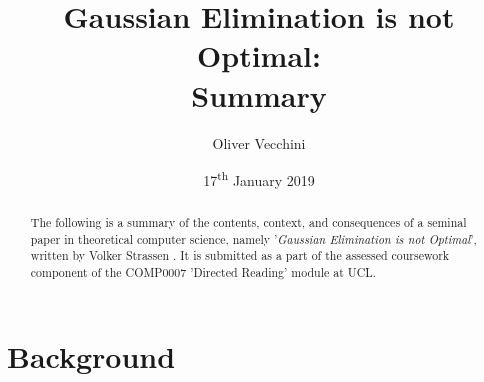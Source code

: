 \documentclass[11pt]{article}
\begin{document}
\title{Gaussian Elimination is not Optimal: \\Summary}
\author{Oliver Vecchini}
\date{17\textsuperscript{th} January 2019}

\maketitle


\begin{abstract}

        The following is a summary of the contents, context, and consequences 
        of a seminal paper in theoretical computer science, namely 
        '\textit{Gaussian Elimination is not Optimal}', written by Volker 
        Strassen \cite{strassen1969gaussian}. It is submitted as a part of the 
        assessed coursework component of the COMP0007 'Directed Reading' module 
        at UCL.

\end{abstract}


\section{Background}
\end{document}
